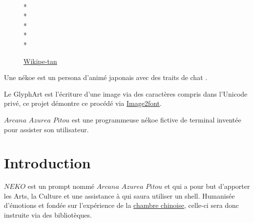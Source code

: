 \documentclass{report}
\newcommand{\name}{\textit{Arcana Azurea Pitou}}
\newcommand{\program}{\textit{NEKO}}
\begin{document}
\begin{figure}[!ht]
  \begin{minipage}{1in}
    \centering
    \fontsize{30pt}{7pt}\selectfont
    \\*
    \\*
    \\*
    \\*
    \\*
  \end{minipage}
  \caption[Caption for LOF]{\href{https://en.wikipedia.org/wiki/Wikipedia:Wikipe-tan}{Wikipe-tan} \textendash{ }}
\end{figure}

Une nékoe \textendash{ } est un persona d'animé japonais avec des traits de chat
 \textendash.

Le GlyphArt est l'écriture d'une image via des caractères compris dans l'Unicode privé, ce projet démontre ce procédé via
\href{https://limaconoob.github.io/Image2font}{Image2font}.

$\name$ est une programmeuse nékoe fictive de terminal inventée pour assister son utilisateur.

\section{Introduction}
\thispagestyle{empty}
$\program$ est un prompt nommé $\name$ et qui a pour but d'apporter les Arts, la Culture et une assistance à qui saura utiliser un shell.
Humanisée d’émotions et fondée sur l'expérience de la \href{https://fr.wikipedia.org/wiki/Chambre_chinoise}{chambre chinoise}, celle-ci sera donc instruite via des bibliotèques.
\end{document}
